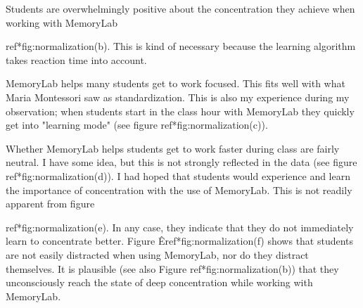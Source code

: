 \documentclass[12pt, a4paper]{article}
\begin{document}
Students are overwhelmingly positive about the concentration they achieve when working with MemoryLab {ref*{fig:normalization}(b). This is kind of necessary because the learning algorithm takes reaction time into account.

MemoryLab helps many students get to work focused. This fits well with what Maria Montessori saw as standardization. This is also my experience during my observation; when students start in the class hour with MemoryLab they quickly get into "learning mode" (see figure ref*{fig:normalization}(c)).

Whether MemoryLab helps students get to work faster during class are fairly neutral. I have some idea, but this is not strongly reflected in the data (see figure ref*{fig:normalization}(d)).
I had hoped that students would experience and learn the importance of concentration with the use of MemoryLab. This is not readily apparent from figure {ref*{fig:normalization}(e). In any case, they indicate that they do not immediately learn to concentrate better.
Figure Êref*{fig:normalization}(f) shows that students are not easily distracted when using MemoryLab, nor do they distract themselves. It is plausible (see also Figure ref*{fig:normalization}(b)) that they unconsciously reach the state of deep concentration while working with MemoryLab.

}}
\end{document}
